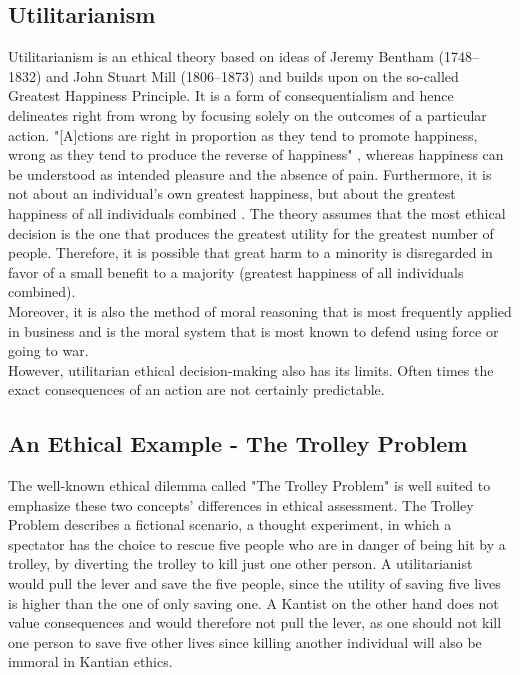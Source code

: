 \documentclass[10pt,twocolumn,twoside]{osajnl}
\begin{document}
\subsection{Utilitarianism}
Utilitarianism is an ethical theory based on ideas of Jeremy Bentham (1748--1832) and John Stuart Mill (1806--1873) and builds upon on the so-called Greatest Happiness Principle.%
It is a form of consequentialism and hence delineates right from wrong by focusing solely on the outcomes of a particular action. 
"[A]ctions are right in proportion as they tend to promote happiness, wrong as they tend to produce the reverse of happiness" \cite{utilitarianism}, whereas happiness can be understood as intended pleasure and the absence of pain.
Furthermore, it is not about an individual's own greatest happiness, but about the greatest happiness of all individuals combined \cite{utilitarianism}. 
The theory assumes that the most ethical decision is the one that produces the greatest utility for the greatest number of people.
Therefore, it is possible that great harm to a minority is disregarded in favor of a small benefit to a majority (greatest happiness of all individuals combined).
\\
Moreover, it is also the method of moral reasoning that is most frequently applied in business \cite{EthicsUnwrapped} and is the moral system that is most known to defend using force or going to war. \\
However, utilitarian ethical decision-making also has its limits. Often times the exact consequences of an action are not certainly predictable.


\subsection{An Ethical Example - The Trolley Problem} %
The well-known ethical dilemma called "The Trolley Problem" is well suited to emphasize these two concepts' differences in ethical assessment. 
The Trolley Problem describes a fictional scenario, a thought experiment, in which a spectator has the choice to rescue five people who are in danger of being hit by a trolley, by diverting the trolley to kill just one other person. 
A utilitarianist would pull the lever and save the five people, since the utility of saving five lives is higher than the one of only saving one. A Kantist on the other hand
does not value consequences and would therefore not pull the lever, as one should not kill one person to save five other lives since killing another individual will also be immoral in Kantian ethics. 
\end{document}
